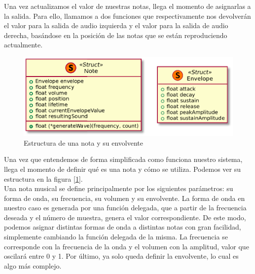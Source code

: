 Una vez actualizamos el valor de nuestras notas, llega el momento de asignarlas a la salida. Para ello, llamamos a dos funciones que respectivamente nos devolverán el valor para la salida de audio izquierda y el valor para la salida de audio derecha, basándose en la posición de las notas que se están reproduciendo actualmente.\\ 

%
%
%  
%
%

\begin{figure}[h]
	\centering
	\includegraphics[width=13cm]{archivos/note}
	\caption{Estructura de una nota y su envolvente}
	\label{fig:note}
\end{figure}

Una vez que entendemos de forma simplificada como funciona nuestro sistema, llega el momento de definir qué es una nota y cómo se utiliza. Podemos ver su estructura en la figura [\ref{fig:note}].\\

Una nota musical se define principalmente por los siguientes parámetros: su forma de onda, su frecuencia, su volumen y su envolvente. La forma de onda en nuestro caso es generada por una función delegada, que a partir de la frecuencia deseada y el número de muestra, genera el valor correspondiente. De este modo, podemos asignar distintas formas de onda a distintas notas con gran facilidad, simplemente cambiando la función delegada de la misma. La frecuencia se corresponde con la frecuencia de la onda y el volumen con la amplitud, valor que oscilará entre 0 y 1. Por último, ya solo queda definir la envolvente, lo cual es algo más complejo.\\

